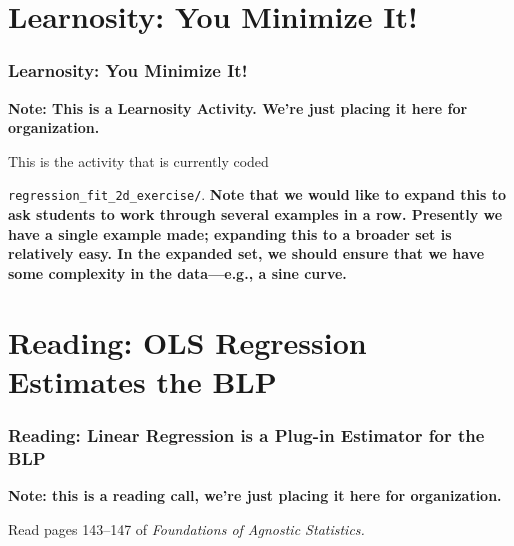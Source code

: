 \documentclass[12pt, block=fill]{beamer}
\begin{document}
\section{Learnosity: You Minimize It!}

\begin{frame}
  \frametitle{Learnosity: You Minimize It!}
  \textbf{Note: This is a Learnosity Activity. We're just placing it
    here for organization.}

  This is the activity that is currently coded%
  
  \texttt{regression\_fit\_2d\_exercise/}.
  \textbf{Note that we would
    like to expand this to ask students to work through several
    examples in a row. Presently we have a single example made;
    expanding this to a broader set is relatively easy. In the
    expanded set, we should ensure that we have some complexity in the
    data—e.g., a sine curve.} 
\end{frame}




\section{Reading: OLS Regression Estimates the BLP}

\begin{frame}
  \frametitle{Reading: Linear Regression is a Plug-in Estimator for the BLP}

  \textbf{Note: this is a reading call, we're just placing it here for
    organization.}

  Read pages 143–147 of \textit{Foundations of Agnostic Statistics.} 
\end{frame} 
\end{document}
